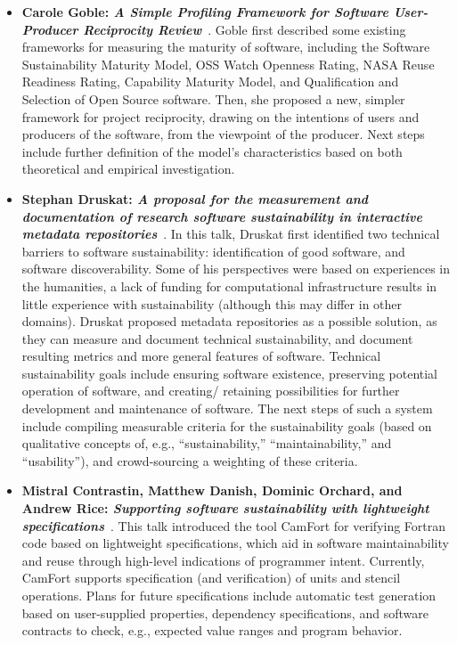 \documentclass[11pt, oneside]{amsart}
\begin{document}
\begin{itemize}[itemsep=1ex]
    \item \textbf{Carole Goble: \emph{A Simple Profiling Framework for Software
    User-Producer Reciprocity Review}}~\cite{Goble:2016ws}.
    Goble first described some existing frameworks for measuring the maturity of
    software, including the Software Sustainability Maturity Model, OSS Watch
    Openness Rating, NASA Reuse Readiness Rating, Capability Maturity Model, and
    Qualification and Selection of Open Source software. Then, she proposed a new,
    simpler framework for project reciprocity, drawing on the intentions of users
    and producers of the software, from the viewpoint of the producer.
    Next steps include further definition of the model's characteristics based on
    both theoretical and empirical investigation.

    \item \textbf{Stephan Druskat: \emph{A proposal for the measurement and
    documentation of research software sustainability in interactive metadata
    repositories}}~\cite{Druskat:2016ws}.
    In this talk, Druskat first identified two technical barriers to software
    sustainability: identification of good software, and software discoverability.
    Some of his perspectives were based on experiences in the humanities, a lack
    of funding for computational infrastructure results in little experience with
    sustainability (although this may differ in other domains). Druskat proposed
    metadata repositories as a possible solution, as they can measure and document
    technical sustainability, and document resulting metrics and more general
    features of software. Technical sustainability goals include ensuring software
    existence, preserving potential operation of software, and creating\slash
    retaining possibilities for further development and maintenance of software.
    The next steps of such a system include compiling measurable criteria for
    the sustainability goals (based on qualitative concepts of, e.g.,
    ``sustainability,'' ``maintainability,'' and ``usability''), and
    crowd-sourcing a weighting of these criteria.

    \item \textbf{Mistral Contrastin, Matthew Danish,
    Dominic Orchard\textsuperscript{\textasteriskcentered}, and
    Andrew Rice: \emph{Supporting software sustainability with
    lightweight specifications}}~\cite{Contrastin:2016ws}.
    This talk introduced the tool CamFort for verifying Fortran code based on
    lightweight specifications, which aid in software maintainability and reuse
    through high-level indications of programmer intent.
    Currently, CamFort supports specification (and
    verification) of units and stencil operations. Plans for future specifications
    include automatic test generation based on user-supplied properties, dependency
    specifications, and software contracts to check, e.g., expected value ranges
    and program behavior.


\end{itemize}
\end{document}
